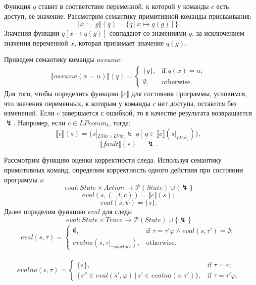 Функция $q$ ставит в соответствие переменной, к которой у команды $c$ есть доступ, её значение. Рассмотрим семантику примитивной команды присваивания:
$$\llbracket x:=g \rrbracket(q) = \{ q[x \mapsto q(g) ] \}.$$ Значения функции $q[x \mapsto q(g) ]$ совпадают со значениями $q$, за исключением значения переменной $x$, которая принимает значение $q(g)$.

Приведем семантику команды $assume$:
\begin{align*}
  \llbracket assume(x=n)\rrbracket(q)=\begin{cases}
    \{q\}, & \text{if $q(x)=n$};\\
    \emptyset, & \text{otherwise}.
  \end{cases}
\end{align*}
Для того, чтобы определить функцию $\llbracket c \rrbracket$ для состояния программы, условимся, что значения переменных, к которым у команды $c$ нет доступа, остаются без изменений. Если $c$ завершается с ошибкой, то в качестве результата возвращается $\lightning$. Например, если $c \in LPcomm_t$, тогда: $$\llbracket c \rrbracket (s) = \{s |_{LVar\backslash LVar_t} \uplus \; q  \;| \; q \in \llbracket c \rrbracket (s |_{LVar_t}) \},$$ $$\llbracket fault \rrbracket (s) = \lightning.$$

Рассмотрим функцию оценки корректности следа. Используя семантику примитивных команд, определим корректность одного действия при состоянии программы $s$:
$$eval: State \times Action \to \mathcal{P}(State) \cup \{ \lightning\} $$
$$eval(s,(\_,t,c)) = \llbracket c\rrbracket (s);$$
$$eval(s,\psi) = \{s\}.$$
Далее определим функцию $eval$ для следа:
$$eval: State \times Trace \to \mathcal{P}(State) \cup \{ \lightning\} $$
\begin{align*}
  eval(s,\tau)=\begin{cases}
    \emptyset, & \text{if $\tau = \tau'\varphi \land eval(s, \tau') = \emptyset$};\\
    evalna(s, \tau |_{\neg abortact}), & \text{otherwise}.
  \end{cases}
\end{align*}

\begin{align*}
     evalna(s,\tau)=\begin{cases}
    \{s\}, & \text{if $\tau =  \varepsilon$};\\ 
     \{s'' \in eval(s', \varphi) \, | \, s' \in  evalna(s, \tau') \}, & \text{if $\tau = \tau'\varphi$}.
   \end{cases}
  \end{align*}

